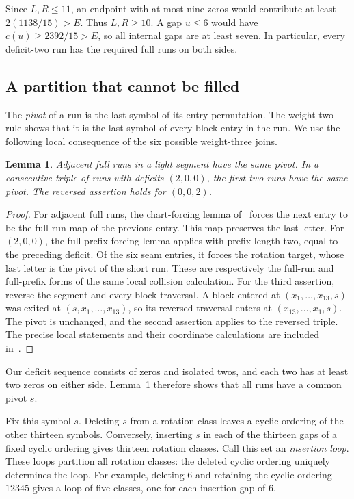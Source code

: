 \documentclass[11pt]{article}
\newtheorem{lemma}[theorem]{Lemma}
\begin{document}
Since $L,R\le11$, an endpoint with at most nine zeros would contribute
at least $2(1138/15)>E$. Thus $L,R\ge10$. A gap $u\le6$ would have
$c(u)\ge2392/15>E$, so all internal gaps are at least seven. In
particular, every deficit-two run has the required full runs on both
sides.

\subsection{A partition that cannot be filled}
The \emph{pivot} of a run is the last symbol of its entry permutation.
The weight-two rule shows that it is the last symbol of every block
entry in the run. We use the following local consequence of the
six possible weight-three joins.

\begin{lemma}\label{lem-pivot}
Adjacent full runs in a light segment have the same pivot. In a
consecutive triple of runs with deficits $(2,0,0)$, the first two runs
have the same pivot. The reversed assertion holds for $(0,0,2)$.
\end{lemma}
\begin{proof}
For adjacent full runs, the chart-forcing lemma of~\cite{framework}
forces the next entry to be the full-run map of the previous entry.
This map preserves the last letter. For $(2,0,0)$, the full-prefix
forcing lemma applies with prefix length two, equal to the preceding
deficit. Of the six seam entries, it forces the rotation target, whose
last letter is the pivot of the short run. These are respectively the
full-run and full-prefix forms of the same local collision calculation.
For the third assertion, reverse the segment and every block traversal.
A block entered at $(x_1,\ldots,x_{13},s)$ was exited at
$(s,x_1,\ldots,x_{13})$, so its reversed traversal enters at
$(x_{13},\ldots,x_1,s)$. The pivot is unchanged, and the second
assertion applies to the reversed triple. The precise local statements and their
coordinate calculations are included in~\cite{framework}.
\end{proof}

Our deficit sequence consists of zeros and isolated twos, and each two
has at least two zeros on either side. Lemma~\ref{lem-pivot} therefore
shows that all runs have a common pivot $s$.

Fix this symbol $s$. Deleting $s$ from a rotation class leaves a cyclic
ordering of the other thirteen symbols. Conversely, inserting $s$ in
each of the thirteen gaps of a fixed cyclic ordering gives thirteen
rotation classes. Call this set an \emph{insertion loop}. These loops
partition all rotation classes: the deleted cyclic ordering uniquely
determines the loop. For example, deleting $6$ and retaining the cyclic
ordering $12345$ gives a loop of five classes, one for each insertion
gap of $6$.
\end{document}
